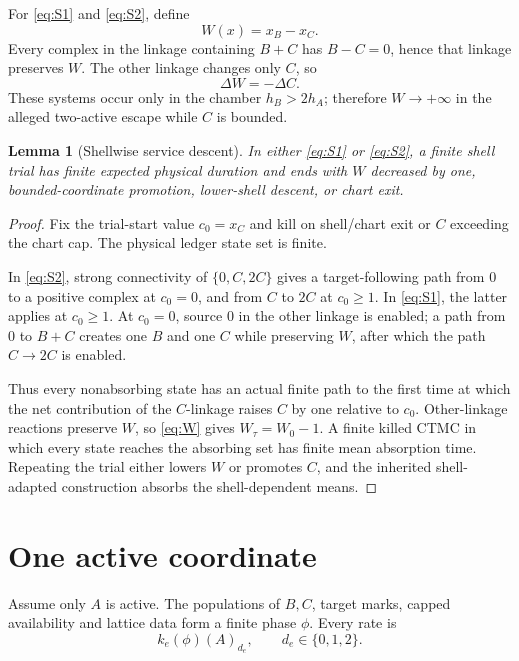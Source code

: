 \documentclass[11pt]{article}
\newtheorem{lemma}[theorem]{Lemma}
\theoremstyle{definition}\newtheorem{definition}[theorem]{Definition}
\theoremstyle{remark}\newtheorem{remark}[theorem]{Remark}
\begin{document}
For \eqref{eq:S1} and \eqref{eq:S2}, define
\[
 W(x)=x_B-x_C.
\]
Every complex in the linkage containing $B+C$ has $B-C=0$, hence that linkage preserves $W$.  The other linkage changes only $C$, so
\begin{equation}\label{eq:W}
 \Delta W=-\Delta C.
\end{equation}
These systems occur only in the chamber $h_B>2h_A$; therefore $W\to+\infty$ in the alleged two-active escape while $C$ is bounded.

\begin{lemma}[Shellwise service descent]\label{lem:service}
In either \eqref{eq:S1} or \eqref{eq:S2}, a finite shell trial has finite expected physical duration and ends with $W$ decreased by one, bounded-coordinate promotion, lower-shell descent, or chart exit.
\end{lemma}

\begin{proof}
Fix the trial-start value $c_0=x_C$ and kill on shell/chart exit or $C$ exceeding the chart cap.  The physical ledger state set is finite.

In \eqref{eq:S2}, strong connectivity of $\{0,C,2C\}$ gives a target-following path from $0$ to a positive complex at $c_0=0$, and from $C$ to $2C$ at $c_0\ge1$.  In \eqref{eq:S1}, the latter applies at $c_0\ge1$.  At $c_0=0$, source $0$ in the other linkage is enabled; a path from $0$ to $B+C$ creates one $B$ and one $C$ while preserving $W$, after which the path $C\to2C$ is enabled.

Thus every nonabsorbing state has an actual finite path to the first time at which the net contribution of the $C$-linkage raises $C$ by one relative to $c_0$.  Other-linkage reactions preserve $W$, so \eqref{eq:W} gives $W_\tau=W_0-1$.  A finite killed CTMC in which every state reaches the absorbing set has finite mean absorption time.  Repeating the trial either lowers $W$ or promotes $C$, and the inherited shell-adapted construction absorbs the shell-dependent means.
\end{proof}

\section{One active coordinate}

Assume only $A$ is active.  The populations of $B,C$, target marks, capped availability and lattice data form a finite phase $\phi$.  Every rate is
\[
 k_e(\phi)(A)_{d_e},\qquad d_e\in\{0,1,2\}.
\]
\end{document}
